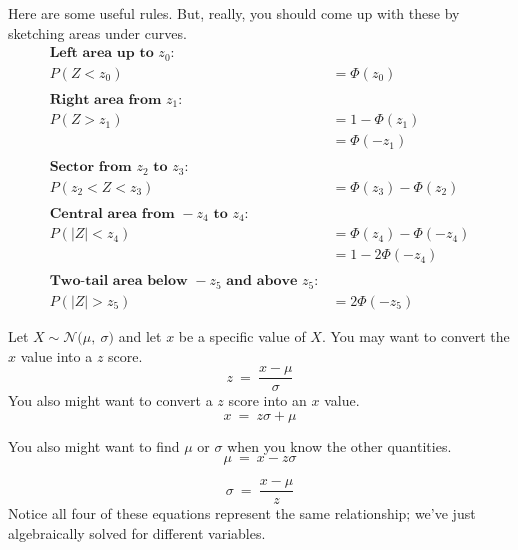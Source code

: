 \documentclass[12pt,letterpaper]{article}
\newcommand{\N}[2]{\mathcal{N}\Big(#1,~ #2\Big)}
\begin{document}



Here are some useful rules. But, really, you should come up with these by sketching areas under curves. 
\begin{align*}
\textbf{Left area up to } z_0: \\
P(Z < z_0) &= \Phi(z_0) \\ \\
\textbf{Right area from } z_1: \\
P(Z > z_1) &= 1 - \Phi(z_1) \\
	       &= \Phi(-z_1)\\ \\
\textbf{Sector from } z_2 \textbf{ to } z_3: \\
P(z_2 < Z < z_3) &= \Phi(z_3) - \Phi(z_2)\\ \\
\textbf{Central area from } -z_4 \textbf{ to } z_4: \\
P(|Z| < z_4) &= \Phi(z_4) - \Phi(-z_4)\\
             &= 1-2\Phi(-z_4)\\ \\
\textbf{Two-tail area below } -z_5 \textbf{ and above } z_5: \\
P(|Z| > z_5) &= 2\Phi(-z_5)
\end{align*}

\vfill
Let $X \sim \N{\mu}{\sigma}$ and let $x$ be a specific value of $X$. You may want to convert the $x$ value into a $z$ score.
$$z ~=~ \frac{x-\mu}{\sigma}$$
You also might want to convert a $z$ score into an $x$ value.
$$x ~=~ z\sigma+\mu$$

\noindent You also might want to find $\mu$ or $\sigma$ when you know the other quantities.
$$\mu ~=~ x-z\sigma$$

$$\sigma ~=~ \frac{x-\mu}{z}$$
Notice all four of these equations represent the same relationship; we've just algebraically solved for different variables.
\vfill
\end{document}
